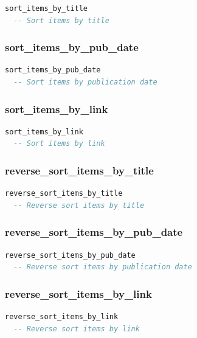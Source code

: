 \begin{lstlisting}[language=Eiffel]
sort_items_by_title
  -- Sort items by title
\end{lstlisting}

\subsubsection{sort\_items\_by\_pub\_date}

\begin{lstlisting}[language=Eiffel]
sort_items_by_pub_date
  -- Sort items by publication date
\end{lstlisting}

\subsubsection{sort\_items\_by\_link}

\begin{lstlisting}[language=Eiffel]
sort_items_by_link
  -- Sort items by link
\end{lstlisting}

\subsubsection{reverse\_sort\_items\_by\_title}

\begin{lstlisting}[language=Eiffel]
reverse_sort_items_by_title
  -- Reverse sort items by title
\end{lstlisting}

\subsubsection{reverse\_sort\_items\_by\_pub\_date}

\begin{lstlisting}[language=Eiffel]
reverse_sort_items_by_pub_date
  -- Reverse sort items by publication date
\end{lstlisting}

\subsubsection{reverse\_sort\_items\_by\_link}

\begin{lstlisting}[language=Eiffel]
reverse_sort_items_by_link
  -- Reverse sort items by link
\end{lstlisting}

